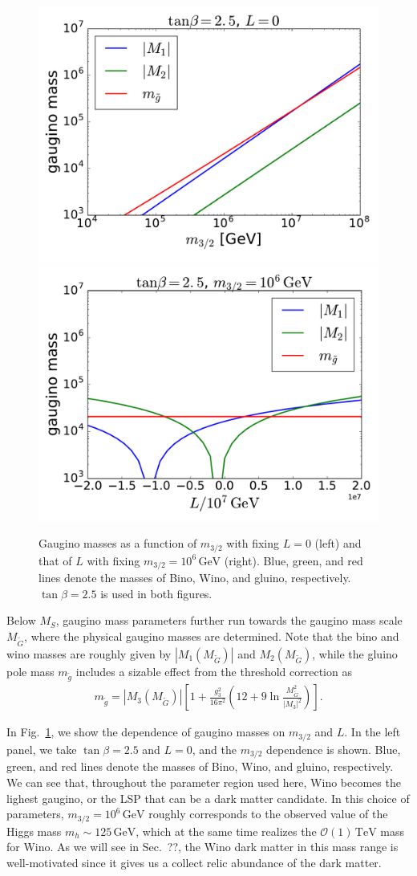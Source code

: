 \documentclass[12pt,twoside,book]{article}
\begin{document}
\begin{figure}
  \centering
  \includegraphics[width=0.48\hsize]{amsb_m32.pdf}
  \includegraphics[width=0.48\hsize]{amsb_L.pdf}
  \caption{
    Gaugino masses as a function of $m_{3/2}$ with fixing $L = 0$ (left) and that of $L$ with fixing $m_{3/2} = 10^6\,\mathrm{GeV}$ (right).
    Blue, green, and red lines denote the masses of Bino, Wino, and gluino, respectively.
    $\tan\beta = 2.5$ is used in both figures.
  }
  \label{fig:amsb_spectrum}
\end{figure}

Below $M_S$, gaugino mass parameters further run towards the gaugino mass scale $M_{\tilde{G}}$, where the physical gaugino masses are determined.
Note that the bino and wino masses are roughly given by $|M_1 (M_{\tilde{G}})|$ and $M_2 (M_{\tilde{G}})$, while the gluino pole mass $m_{\tilde{g}}$ includes a sizable effect from the threshold correction as \cite{Giudice:2004tc}
\begin{align}
  m_{\tilde{g}} = |M_3 (M_{\tilde{G}})| \left[
  1 + \frac{g_3^2}{16\pi^2} \left( 12 + 9\ln \frac{M_{\tilde{G}}^2}{|M_3|^2} \right)
  \right].
\end{align}

In Fig.~\ref{fig:amsb_spectrum}, we show the dependence of gaugino masses on $m_{3/2}$ and $L$.
In the left panel, we take $\tan\beta = 2.5$ and $L=0$, and the $m_{3/2}$ dependence is shown.
Blue, green, and red lines denote the masses of Bino, Wino, and gluino, respectively.
We can see that, throughout the parameter region used here, Wino becomes the lighest gaugino, or the LSP that can be a dark matter candidate.
In this choice of parameters, $m_{3/2} = 10^6\,\mathrm{GeV}$ roughly corresponds to the observed value of the Higgs mass $m_h \sim 125\,\mathrm{GeV}$, which at the same time realizes the $\mathcal{O}(1)\,\mathrm{TeV}$ mass for Wino.
As we will see in Sec.~??,  the Wino dark matter in this mass range is well-motivated since it gives us a collect relic abundance of the dark matter.
\end{document}
